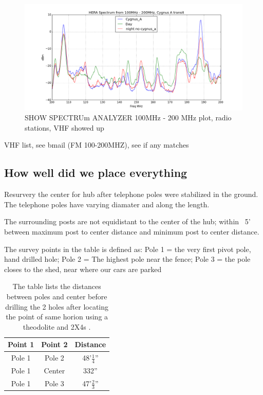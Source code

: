 \documentclass[preprint]{aastex}  %
\begin{document}
\begin{figure}[H]
	\begin{center}
	\includegraphics[width =\textwidth]{spectra_plots/transit,day,night_match-yaxis.png}
	\caption{SHOW SPECTRUm ANALYZER 100MHz - 200 MHz plot, radio stations, VHF showed up
\label{Fig:RFI} }
	\end{center}
\end{figure}

VHF list, see bmail (FM 100-200MHZ), see if any matches

\subsection{How well did we place everything}
Resurvery the center for hub after telephone poles were stabilized in the ground. The telephone poles have varying diamater and along the length. 

The surrounding posts are not equidistant to the center of the hub; within ~5' between maximum post to center distance and minimum post to center distance.

The survey points in the table is defined as:
Pole 1 = the very first pivot pole, hand drilled hole; 
Pole 2 = The highest pole near the fence; 
Pole 3 = the pole closes to the shed, near where our cars are parked


\begin{table}[!h]
\centering
\begin{tabular}{|c|c|c|} \hline

Point 1 & Point 2 & Distance \\ \hline
Pole 1 & Pole 2 & 48'$\frac{1}{4}$'' \\ \hline
Pole 1 & Center & 332'' \\ \hline
Pole 1 & Pole 3 & 47'$\frac{2}{3}$'' \\ \hline

\end{tabular}
\caption{The table lists the distances between poles and center before drilling the 2 holes after locating 
the point of same horion using a theodolite and 2X4s \label{Tab:survey_dist_b4_2holes}.}
\end{table}
\end{document}
